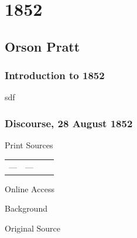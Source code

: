 \section{1852}

	\subsection{Orson Pratt}
		\label{EMS-1852-OP}

		\subsubsection{Introduction to 1852}
		
			sdf
			
		\subsubsection{Discourse, 28 August 1852}
			\label{EMS-1852-OP-28-AUG-1852}
			
			\begin{description}
					\item[Print Sources]
				\end{description}

					\begin{tabular}{p{0.5in}p{1in}p{0.5in}p{1in}}
					---	& ---		&  		&  \\
					\end{tabular}
				
				\begin{description}
					\item[Online Access] %
				\end{description}
				
				\begin{description}
					\item[Background]
				\end{description}
				
					\phantom{.}
				
				\begin{description}
					\item[Original Source]
				\end{description}
				
